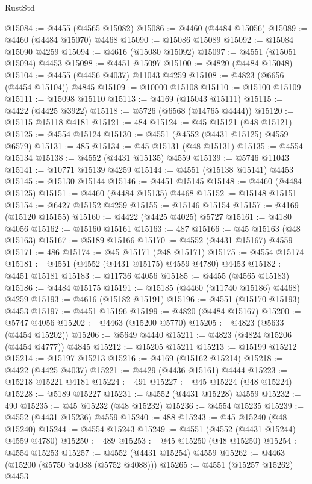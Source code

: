 \begin{lexlean}{RustStd}
\begin{coremodule}
@15084 := @4455 (@4565 @15082)
@15086 := @4460 (@4484 @15056)
@15089 := @4460 (@4484 @15070) @4468
@15090 := @15086 @15089
@15092 := @15084 @15090 @4259
@15094 := @4616 (@15080 @15092)
@15097 := @4551 (@15051 @15094) @4453
@15098 := @4451 @15097
@15100 := @4820 (@4484 @15048)
@15104 := @4455 (@4456 @4037) @11043 @4259
@15108 := @4823 (@6656 (@4454 @15104)) @4845
@15109 := @10000 @15108
@15110 := @15100 @15109
@15111 := @15098 @15110
@15113 := @4169 (@15043 @15111)
@15115 := @4422 (@4425 @3922)
@15118 := @5726 (@6568 (@14765 @4444))
@15120 := @15115 @15118 @4181
@15121 := 484
@15124 := @45 @15121 (@48 @15121)
@15125 := @4554 @15124
@15130 := @4551 (@4552 (@4431 @15125) @4559 @6579)
@15131 := 485
@15134 := @45 @15131 (@48 @15131)
@15135 := @4554 @15134
@15138 := @4552 (@4431 @15135) @4559
@15139 := @5746 @11043
@15141 := @10771 @15139 @4259
@15144 := @4551 (@15138 @15141) @4453
@15145 := @15130 @15144
@15146 := @4451 @15145
@15148 := @4460 (@4484 @15125)
@15151 := @4460 (@4484 @15135) @4468
@15152 := @15148 @15151
@15154 := @6427 @15152 @4259
@15155 := @15146 @15154
@15157 := @4169 (@15120 @15155)
@15160 := @4422 (@4425 @4025) @5727
@15161 := @4180 @4056
@15162 := @15160 @15161
@15163 := 487
@15166 := @45 @15163 (@48 @15163)
@15167 := @5189 @15166
@15170 := @4552 (@4431 @15167) @4559
@15171 := 486
@15174 := @45 @15171 (@48 @15171)
@15175 := @4554 @15174
@15181 := @4551 (@4552 (@4431 @15175) @4559 @4780) @4453
@15182 := @4451 @15181
@15183 := @11736 @4056
@15185 := @4455 (@4565 @15183)
@15186 := @4484 @15175
@15191 := @15185 (@4460 (@11740 @15186) @4468) @4259
@15193 := @4616 (@15182 @15191)
@15196 := @4551 (@15170 @15193) @4453
@15197 := @4451 @15196
@15199 := @4820 (@4484 @15167)
@15200 := @5747 @4056
@15202 := @4463 (@15200 @5770)
@15205 := @4823 (@5633 (@4454 @15202))
@15206 := @5649 @4440
@15211 := @4823 (@4824 @15206 (@4454 @4777)) @4845
@15212 := @15205 @15211
@15213 := @15199 @15212
@15214 := @15197 @15213
@15216 := @4169 (@15162 @15214)
@15218 := @4422 (@4425 @4037)
@15221 := @4429 (@4436 @15161) @4444
@15223 := @15218 @15221 @4181
@15224 := 491
@15227 := @45 @15224 (@48 @15224)
@15228 := @5189 @15227
@15231 := @4552 (@4431 @15228) @4559
@15232 := 490
@15235 := @45 @15232 (@48 @15232)
@15236 := @4554 @15235
@15239 := @4552 (@4431 @15236) @4559
@15240 := 488
@15243 := @45 @15240 (@48 @15240)
@15244 := @4554 @15243
@15249 := @4551 (@4552 (@4431 @15244) @4559 @4780)
@15250 := 489
@15253 := @45 @15250 (@48 @15250)
@15254 := @4554 @15253
@15257 := @4552 (@4431 @15254) @4559
@15262 := @4463 (@15200 (@5750 @4088 (@5752 @4088)))
@15265 := @4551 (@15257 @15262) @4453

\end{coremodule}
\end{lexlean}
